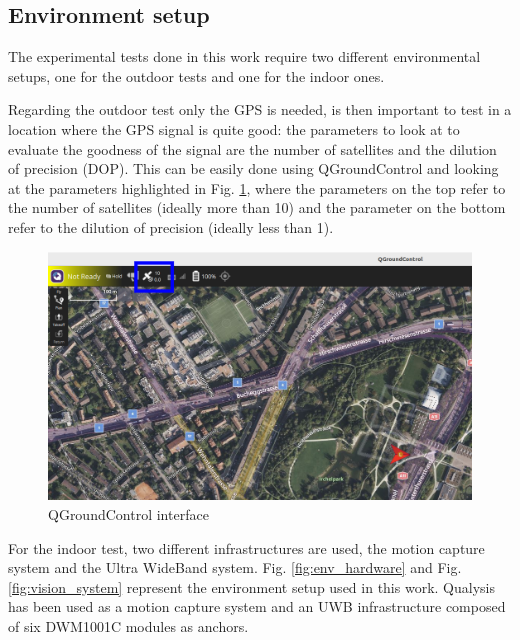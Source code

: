 \documentclass[journal]{IEEEtran}
\begin{document}
\subsection{Environment setup} \label{Environment-setup}

The experimental tests done in this work require two different environmental setups, one for the outdoor tests and one for the indoor ones. 

Regarding the outdoor test only the GPS is needed, is then important to test in a location where the GPS signal is quite good: the parameters to look at to evaluate the goodness of the signal are the number of satellites and the dilution of precision (DOP). This can be easily done using QGroundControl \cite{QGroundControl} and looking at the parameters highlighted in Fig. \ref{fig:QGroundControl}, where the parameters on the top refer to the number of satellites (ideally more than 10) and the parameter on the bottom refer to the dilution of precision (ideally less than 1).

\begin{figure}
    \centering
    \includegraphics[scale=0.26]{Images/QGroundControl_cut.png}
    \caption{QGroundControl interface}
    \label{fig:QGroundControl}
\end{figure}

For the indoor test, two different infrastructures are used, the motion capture system and the Ultra WideBand system. Fig. \ref{fig:env_hardware} and Fig. \ref{fig:vision_system} represent the environment setup used in this work. Qualysis has been used as a motion capture system and an UWB infrastructure composed of six DWM1001C modules as anchors.
\end{document}
